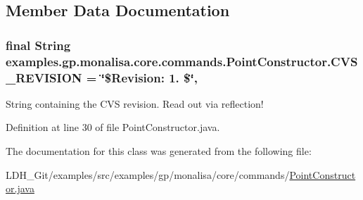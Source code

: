 \subsection{Member Data Documentation}
\hypertarget{classexamples_1_1gp_1_1monalisa_1_1core_1_1commands_1_1_point_constructor_a03b4de0abf3aa0206ed1b750759f1e8e}{
\subsubsection[{C\-V\-S\-\_\-\-R\-E\-V\-I\-S\-I\-O\-N}]{\setlength{\rightskip}{0pt plus 5cm}final String examples.\-gp.\-monalisa.\-core.\-commands.\-Point\-Constructor.\-C\-V\-S\-\_\-\-R\-E\-V\-I\-S\-I\-O\-N = \char`\"{}\$Revision\-: 1. \$\char`\"{}\hspace{0.3cm}{\ttfamily [static]}, {\ttfamily [private]}}}\label{classexamples_1_1gp_1_1monalisa_1_1core_1_1commands_1_1_point_constructor_a03b4de0abf3aa0206ed1b750759f1e8e}
String containing the C\-V\-S revision. Read out via reflection! 

Definition at line 30 of file Point\-Constructor.\-java.



The documentation for this class was generated from the following file\-:\begin{DoxyCompactItemize}
\item 
L\-D\-H\-\_\-\-Git/examples/src/examples/gp/monalisa/core/commands/\hyperlink{_point_constructor_8java}{Point\-Constructor.\-java}\end{DoxyCompactItemize}
